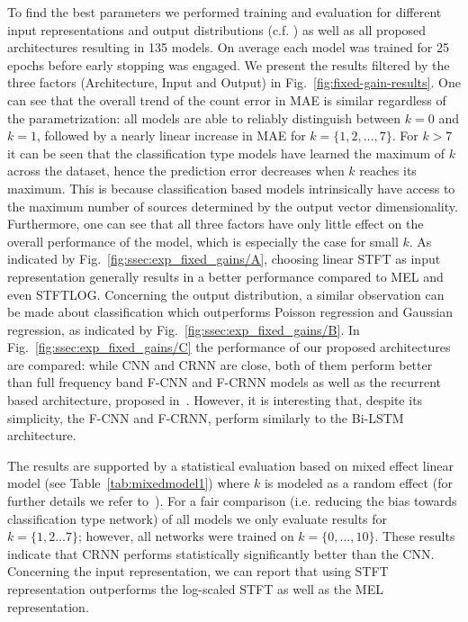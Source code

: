 To find the best parameters we performed training and evaluation for different input representations and output distributions (c.f. \cite{stoeter17}) as well as all proposed architectures resulting in 135 models.
On average each model was trained for 25 epochs before early stopping was engaged.
We present the results filtered by the three factors (Architecture, Input and Output) in Fig.~\ref{fig:fixed-gain-results}.
One can see that the overall trend of the count error in MAE is similar regardless of the parametrization: all models are able to reliably distinguish between \(k=0\) and \(k=1\), followed by a nearly linear increase in MAE for \(k=\{1, 2, \dots, 7\}\).
For \(k > 7\) it can be seen that the classification type models have learned the maximum of \(k\) across the dataset, hence the prediction error decreases when \(k\) reaches its maximum.
This is because classification based models intrinsically have access to the maximum number of sources determined by the output vector dimensionality.
Furthermore, one can see that all three factors have only little effect on the overall performance of the model, which is especially the case for small \(k\).
As indicated by Fig.~\ref{fig:ssec:exp_fixed_gains/A}, choosing linear STFT as input representation generally results in a better performance compared to MEL and even STFTLOG.
Concerning the output distribution, a similar observation can be made about classification which outperforms Poisson regression and Gaussian regression, as indicated by Fig.~\ref{fig:ssec:exp_fixed_gains/B}.
In Fig.~\ref{fig:ssec:exp_fixed_gains/C} the performance of our proposed architectures are compared:
while CNN and CRNN are close, both of them perform better than full frequency band F-CNN and F-CRNN models as well as the recurrent based architecture, proposed in~\cite{stoeter17}.
However, it is interesting that, despite its simplicity, the F-CNN and F-CRNN, perform similarly to the Bi-LSTM architecture.
\par
The results are supported by a statistical evaluation based on mixed effect linear model (see Table~\ref{tab:mixedmodel1}) where \(k\) is modeled as a random effect (for further details we refer to~\cite{Mcculloch06}).
For a fair comparison (i.e. reducing the bias towards classification type network) of all models we only evaluate results for \(k = \{1, 2\dots7\}\); however, all networks were trained on \(k = \{0, \dots, 10\}\).
These results indicate that CRNN performs statistically significantly better than the CNN.\@
Concerning the input representation, we can report that using STFT representation outperforms the log-scaled STFT as well as the MEL representation.
